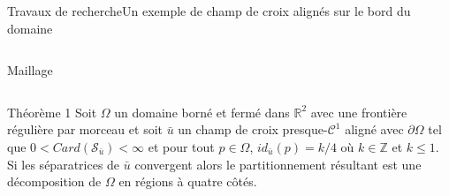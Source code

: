 \documentclass[compress,10pt,aspectratio=169]{beamer}
\begin{document}
\begin{frame}{Travaux de recherche}{Un exemple de champ de croix alignés sur le bord du domaine}
\begin{columns}
\begin{column}{0.33\textwidth}
        \footnotesize Maillage
        \end{column}
    \end{columns}
    \vspace{0.4cm}
        \begin{onerablock}{\small Théorème 1}
    \small
Soit $\Omega$ un domaine borné et fermé dans $\mathbb{R}^2$ avec une frontière régulière par morceau et soit $\bar{u}$ un champ de croix presque-$\mathcal{C}^1$ aligné avec $\partial\Omega$ tel que $0<Card(\mathcal{S}_{\bar{u}})<\infty$ et pour tout $p\in\Omega$, $id_{\bar{u}}(p)=k/4$ où $k\in\mathbb{Z}$ et $k\leq 1$. Si les séparatrices de $\bar{u}$ convergent alors le partitionnement résultant est une décomposition de $\Omega$ en régions à quatre côtés.
    \end{onerablock}
\end{frame}
\end{document}
